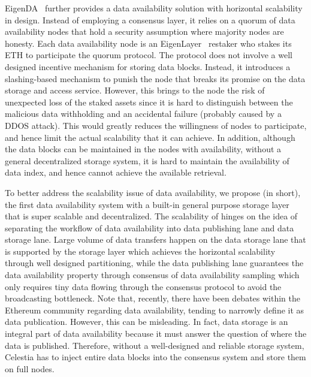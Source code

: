 EigenDA~\cite{eigenda} further provides a data availability solution with horizontal scalability in design. Instead of employing a consensus layer, it relies on a quorum of data availability nodes that hold a security assumption where majority nodes are honesty. Each data availability node is an EigenLayer~\cite{eigenlayer} restaker who stakes its ETH to participate the quorum protocol. The protocol does not involve a well designed incentive mechanism for storing data blocks. Instead, it introduces a slashing-based mechanism to punish the node that breaks its promise on the data storage and access service. However, this brings to the node the risk of unexpected loss of the staked assets since it is hard to distinguish between the malicious data withholding and an accidental failure (probably caused by a DDOS attack). This would greatly reduces the willingness of nodes to participate, and hence limit the actual scalability that it can achieve. 
In addition, although the data blocks can be maintained in the nodes with availability, without a general decentralized storage system, it is hard to maintain the availability of data index, and hence cannot achieve the available retrieval.

To better address the scalability issue of data availability, we propose \project (\projabbrev in short), the first data availability system with a built-in general purpose storage layer that is super scalable and decentralized. The scalability of \projabbrev hinges on the idea of separating the workflow of data availability into data publishing lane and data storage lane. 
Large volume of data transfers happen on the data storage lane that is supported by the storage layer which achieves the horizontal scalability through well designed partitioning, while the data publishing lane guarantees the data availability property through consensus of data availability sampling which only requires tiny data flowing through the consensus protocol to avoid the broadcasting bottleneck. 
Note that, recently, there have been debates within the Ethereum community regarding data availability, tending to narrowly define it as data publication. However, this can be misleading. In fact, data storage is an integral part of data availability because it must answer the question of where the data is published. Therefore, without a well-designed and reliable storage system, Celestia has to inject entire data blocks into the consensus system and store them on full nodes.

